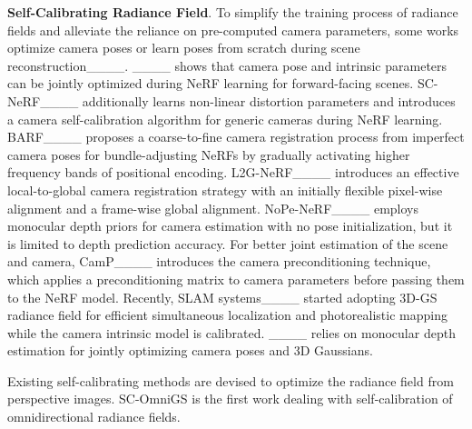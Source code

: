 \textbf{Self-Calibrating Radiance Field}.
To simplify the training process of radiance fields and alleviate the reliance on pre-computed camera parameters, some works optimize camera poses or learn poses from scratch during scene reconstruction____. 
____ shows that camera pose and intrinsic parameters can be jointly optimized during NeRF learning for forward-facing scenes. 
SC-NeRF____ additionally learns non-linear distortion parameters and introduces a camera self-calibration algorithm for generic cameras during NeRF learning.
BARF____ proposes a coarse-to-fine camera registration process from imperfect camera poses for bundle-adjusting NeRFs by gradually activating higher frequency bands of positional encoding. 
L2G-NeRF____ introduces an effective local-to-global camera registration strategy with an initially flexible pixel-wise alignment and a frame-wise global alignment. %
NoPe-NeRF____ employs monocular depth priors for camera estimation with no pose initialization, but it is limited to depth prediction accuracy.  
For better joint estimation of the scene and camera, CamP____ introduces the camera preconditioning technique, which applies a preconditioning matrix to camera parameters before passing them to the NeRF model.
Recently, SLAM systems____ started adopting 3D-GS radiance field for efficient simultaneous localization and photorealistic mapping while the camera intrinsic model is calibrated. ____ relies on monocular depth estimation for jointly optimizing camera poses and 3D Gaussians. 

Existing self-calibrating methods are devised to optimize the radiance field from perspective images. SC-OmniGS is the first work dealing with self-calibration of omnidirectional radiance fields.

